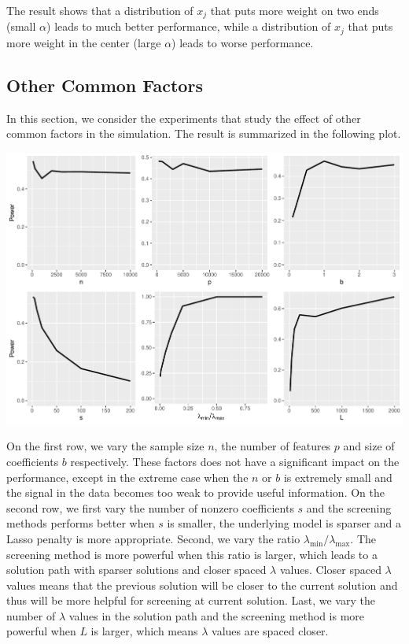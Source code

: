 The result shows that a distribution of $x_j$ that puts more weight on two ends (small $\alpha$) leads to much better performance, while a distribution of $x_j$ that puts more weight in the center (large $\alpha$) leads to worse performance.

\subsection{Other Common Factors}

In this section, we consider the experiments that study the effect of other common factors in the simulation. The result is summarized in the following plot.

\begin{center}
    \includegraphics[width=\textwidth]{coxsim.pdf}
\end{center}

On the first row, we vary the sample size $n$, the number of features $p$ and size of coefficients $b$ respectively. These factors does not have a significant impact on the performance, except in the extreme case when the $n$ or $b$ is extremely small and the signal in the data becomes too weak to provide useful information. On the second row, we first vary the number of nonzero coefficients $s$ and the screening methods performs better when $s$ is smaller, the underlying model is sparser and a Lasso penalty is more appropriate. Second, we vary the ratio $\lambda_{\min}/\lambda_{\max}$. The screening method is more powerful when this ratio is larger, which leads to a solution path with sparser solutions and closer spaced $\lambda$ values. Closer spaced $\lambda$ values means that the previous solution will be closer to the current solution and thus will be more helpful for screening at current solution. Last, we vary the number of $\lambda$ values in the solution path and the screening method is more powerful when $L$ is larger, which means $\lambda$ values are spaced closer.  


